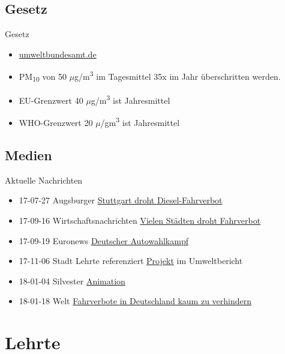 \documentclass[aspectratio=169]{beamer} %
\begin{document}
\subsection{Gesetz}
\begin{frame}{Gesetz}
  \begin{itemize}
  \item \href{https://www.umweltbundesamt.de/daten/luft/feinstaub-belastung}{umweltbundesamt.de}
  \item PM\textsubscript{10} von 50 $\mu$g/m\textsuperscript{3} im Tagesmittel 35x im Jahr überschritten werden.
  \item EU-Grenzwert 40 $\mu$g/m\textsuperscript{3} ist Jahresmittel
  \item WHO-Grenzwert 20 $\mu$/gm\textsuperscript{3} ist Jahresmittel
  \end{itemize}
\end{frame}

\subsection*{Medien}
\begin{frame}{Aktuelle Nachrichten}
  \begin{itemize}
  \item 17-07-27 Augsburger \href{http://www.augsburger-allgemeine.de/panorama/In-Stuttgart-droht-jetzt-ein-Diesel-Fahrverbot-id42204121.html}{Stuttgart droht Diesel-Fahrverbot}
  \item 17-09-16 Wirtschaftsnachrichten \href{https://deutsche-wirtschafts-nachrichten.de/2017/09/16/feinstaub-belastung-vielen-staedten-drohen-fahrverbote/}{Vielen Städten droht Fahrverbot}
  \item 17-09-19 Euronews \href{http://de.euronews.com/2017/09/19/der-deutsche-autowahlkampf}{Deutscher Autowahlkampf}
  \item 17-11-06 Stadt Lehrte referenziert \href{http://piratenpartei-lehrte.de/2017/09/11/feinstaub-in-lehrte/}{Projekt} im Umweltbericht
  \item 18-01-04 Silvester \href{https://sbamueller.wordpress.com/2018/01/01/silvester-und-feinstaub/}{Animation}
  \item 18-01-18 Welt \href{https://www.welt.de/wirtschaft/article172580444/Fahrverbote-kann-Deutschland-kaum-noch-verhindern.html}{Fahrverbote in Deutschland kaum zu verhindern}
  \end{itemize}
\end{frame}

\section{Lehrte}
\end{document}
